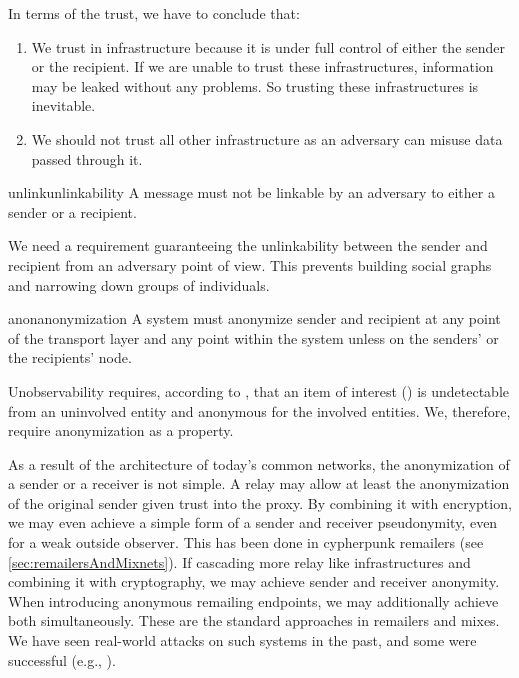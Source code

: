 In terms of the trust, we have to conclude that:
\begin{enumerate}
	\item We trust in infrastructure because it is under full control of either the sender or the recipient. If we are unable to trust these infrastructures, information may be leaked without any problems. So trusting these infrastructures is inevitable.
	\item We should not trust all other infrastructure as an adversary can misuse data passed through it.
\end{enumerate}

\begin{requirement}{unlink}{unlinkability}
	A message must not be linkable by an adversary to either a sender or a recipient.
\end{requirement}

We need a requirement guaranteeing the unlinkability between the sender and recipient from an adversary point of view. This prevents building social graphs and narrowing down groups of individuals.

\begin{requirement}{anon}{anonymization}
	A system must anonymize sender and recipient at any point of the transport layer and any point within the system unless on the senders' or the recipients' node.
\end{requirement}

Unobservability requires, according to \cite{anonTerminology}, that an item of interest () is undetectable from an uninvolved entity and anonymous for the involved entities. We, therefore, require anonymization as a property.

As a result of the architecture of today's common networks, the anonymization of a sender or a receiver is not simple. A relay may allow at least the anonymization of the original sender given trust into the proxy. By combining it with encryption, we may even achieve a simple form of a sender and receiver pseudonymity, even for a weak outside observer. This has been done in cypherpunk remailers (see \cref{sec:remailersAndMixnets}). If cascading more relay like infrastructures and combining it with cryptography, we may achieve sender and receiver anonymity. When introducing anonymous remailing endpoints, we may additionally achieve both simultaneously. These are the standard approaches in remailers and mixes. We have seen real-world attacks on such systems in the past, and some were successful (e.g., \cite{penetClosure}). 

